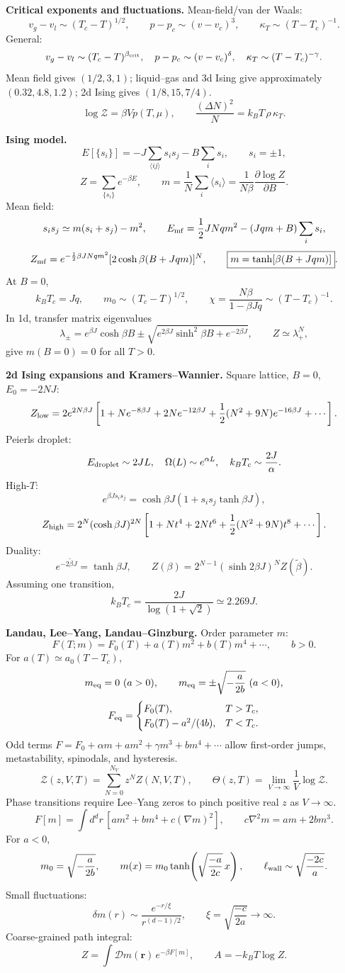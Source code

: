 \noindent\textbf{Critical exponents and fluctuations.}\quad
Mean-field/van der Waals:
\[
v_g-v_l\sim(T_c-T)^{1/2},\qquad
p-p_c\sim(v-v_c)^3,\qquad
\kappa_T\sim(T-T_c)^{-1}.
\]
General:
\[
v_g-v_l\sim(T_c-T)^{\beta_{\rm crit}},\quad
p-p_c\sim(v-v_c)^\delta,\quad
\kappa_T\sim(T-T_c)^{-\gamma}.
\]
Mean field gives $(1/2,3,1)$; liquid--gas and 3d Ising give
approximately $(0.32,4.8,1.2)$; 2d Ising gives $(1/8,15,7/4)$.
\[
\log\mathcal Z=\beta Vp(T,\mu),
\qquad
\boxed{\frac{(\Delta N)^2}{N}=k_BT\,\rho\,\kappa_T}.
\]

\noindent\textbf{Ising model.}\quad
\[
E[\{s_i\}]=-J\sum_{\langle ij\rangle}s_is_j-B\sum_i s_i,
\qquad s_i=\pm1,
\]
\[
Z=\sum_{\{s_i\}}e^{-\beta E},
\qquad
m=\frac1N\sum_i\langle s_i\rangle
=\frac{1}{N\beta}\frac{\partial\log Z}{\partial B}.
\]
Mean field:
\[
s_is_j\simeq m(s_i+s_j)-m^2,\qquad
E_{\rm mf}=\frac12JNqm^2-(Jqm+B)\sum_i s_i,
\]
\[
Z_{\rm mf}=e^{-\frac12\beta JNqm^2}
[2\cosh\beta(B+Jqm)]^N,
\qquad
\boxed{m=\tanh[\beta(B+Jqm)]}.
\]
At $B=0$,
\[
\boxed{k_BT_c=Jq},\qquad
m_0\sim(T_c-T)^{1/2},
\qquad
\chi=\frac{N\beta}{1-\beta Jq}\sim(T-T_c)^{-1}.
\]
In 1d, transfer matrix eigenvalues
\[
\lambda_\pm=e^{\beta J}\cosh\beta B
\pm\sqrt{e^{2\beta J}\sinh^2\beta B+e^{-2\beta J}},
\qquad Z\simeq\lambda_+^N,
\]
give $m(B=0)=0$ for all $T>0$.

\noindent\textbf{2d Ising expansions and Kramers--Wannier.}\quad
Square lattice, $B=0$, $E_0=-2NJ$:
\[
Z_{\rm low}=2e^{2N\beta J}\left[
1+Ne^{-8\beta J}+2Ne^{-12\beta J}
+\frac12(N^2+9N)e^{-16\beta J}+\cdots\right].
\]
Peierls droplet:
\[
E_{\rm droplet}\sim2JL,\quad \Omega(L)\sim e^{\alpha L},
\quad k_BT_c\sim\frac{2J}{\alpha}.
\]
High-$T$:
\[
e^{\beta Js_is_j}=\cosh\beta J(1+s_is_j\tanh\beta J),
\]
\[
Z_{\rm high}=2^N(\cosh\beta J)^{2N}
\left[1+Nt^4+2Nt^6+\frac12(N^2+9N)t^8+\cdots\right].
\]
Duality:
\[
e^{-2\tilde\beta J}=\tanh\beta J,\qquad
\boxed{Z(\beta)=2^{N-1}(\sinh2\beta J)^NZ(\tilde\beta)}.
\]
Assuming one transition,
\[
\boxed{k_BT_c=\frac{2J}{\log(1+\sqrt2)}}\simeq2.269J.
\]

\noindent\textbf{Landau, Lee--Yang, Landau--Ginzburg.}\quad
Order parameter $m$:
\[
F(T;m)=F_0(T)+a(T)m^2+b(T)m^4+\cdots,\qquad b>0.
\]
For $a(T)\simeq a_0(T-T_c)$,
\[
m_{\rm eq}=0\ (a>0),\qquad
m_{\rm eq}=\pm\sqrt{-\frac{a}{2b}}\ (a<0),
\]
\[
F_{\rm eq}=
\begin{cases}
F_0(T),&T>T_c,\\
F_0(T)-a^2/(4b),&T<T_c.
\end{cases}
\]
Odd terms $F=F_0+\alpha m+am^2+\gamma m^3+bm^4+\cdots$ allow first-order
jumps, metastability, spinodals, and hysteresis.
\[
\mathcal Z(z,V,T)=\sum_{N=0}^{N_V}z^NZ(N,V,T),
\qquad
\Theta(z,T)=\lim_{V\to\infty}\frac1V\log\mathcal Z.
\]
Phase transitions require Lee--Yang zeros to pinch positive real $z$ as
$V\to\infty$.
\[
F[m]=\int d^dr\,[a m^2+b m^4+c(\nabla m)^2],
\qquad
\boxed{c\nabla^2m=am+2bm^3}.
\]
For $a<0$,
\[
m_0=\sqrt{-\frac{a}{2b}},\qquad
m(x)=m_0\tanh\!\left(\sqrt{\frac{-a}{2c}}\,x\right),
\qquad
\ell_{\rm wall}\sim\sqrt{\frac{-2c}{a}}.
\]
Small fluctuations:
\[
\delta m(r)\sim\frac{e^{-r/\xi}}{r^{(d-1)/2}},
\qquad
\boxed{\xi=\sqrt{\frac{-c}{2a}}\to\infty}.
\]
Coarse-grained path integral:
\[
Z=\int\mathcal Dm(\mathbf r)\,e^{-\beta F[m]},
\qquad
A=-k_BT\log Z.
\]

